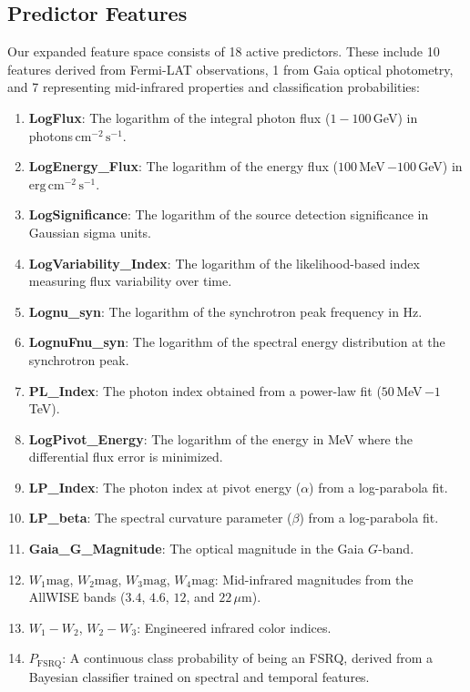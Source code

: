 \documentclass[twocolumn,linenumbers,floatfix]{aastex701}
\begin{document}
\subsection{Predictor Features}
Our expanded feature space consists of 18 active predictors. These include 10 features derived from Fermi-LAT observations, 1 from Gaia optical photometry, and 7 representing mid-infrared properties and classification probabilities:
\begin{enumerate}
    \item \textbf{LogFlux}: The logarithm of the integral photon flux ($1 - 100$\,GeV) in photons\,$\text{cm}^{-2}\,\text{s}^{-1}$.
    \item \textbf{LogEnergy\_Flux}: The logarithm of the energy flux ($100$\,MeV\,$- 100$\,GeV) in $\text{erg}\,\text{cm}^{-2}\,\text{s}^{-1}$.
    \item \textbf{LogSignificance}: The logarithm of the source detection significance in Gaussian sigma units.
    \item \textbf{LogVariability\_Index}: The logarithm of the likelihood-based index measuring flux variability over time.
    \item \textbf{Lognu\_syn}: The logarithm of the synchrotron peak frequency in Hz.
    \item \textbf{LognuFnu\_syn}: The logarithm of the spectral energy distribution at the synchrotron peak.
    \item \textbf{PL\_Index}: The photon index obtained from a power-law fit ($50$\,MeV\,$- 1$\,TeV).
    \item \textbf{LogPivot\_Energy}: The logarithm of the energy in MeV where the differential flux error is minimized.
    \item \textbf{LP\_Index}: The photon index at pivot energy ($\alpha$) from a log-parabola fit.
    \item \textbf{LP\_beta}: The spectral curvature parameter ($\beta$) from a log-parabola fit.
    \item \textbf{Gaia\_G\_Magnitude}: The optical magnitude in the Gaia $G$-band.
    \item \textbf{$W_1\text{mag}$}, \textbf{$W_2\text{mag}$}, \textbf{$W_3\text{mag}$}, \textbf{$W_4\text{mag}$}: Mid-infrared magnitudes from the AllWISE bands ($3.4$, $4.6$, $12$, and $22$\,$\mu\text{m}$).
    \item \textbf{$W_1 - W_2$}, \textbf{$W_2 - W_3$}: Engineered infrared color indices.
    \item \textbf{$P_{\text{FSRQ}}$}: A continuous class probability of being an FSRQ, derived from a Bayesian classifier trained on spectral and temporal features.
\end{enumerate}
\end{document}
